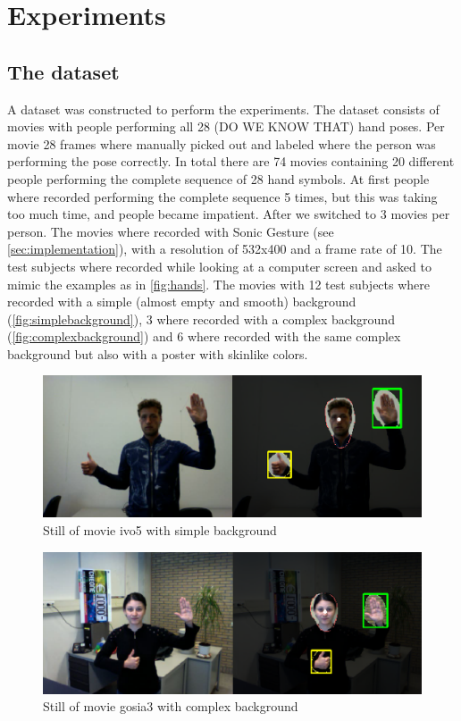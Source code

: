 
\chapter{Experiments}
\label{ch:experiments}


\section{The dataset}
A dataset was constructed to perform the experiments. The dataset consists of movies with people performing all 28 (DO WE KNOW THAT) hand poses. Per movie 28 frames where manually picked out and labeled where the person was performing the pose correctly. In total there are 74 movies containing 20 different people performing the complete sequence of 28 hand symbols. At first people where recorded performing the complete sequence 5 times, but this was taking too much time, and people became impatient. After we switched to 3 movies per person. The movies where recorded with Sonic Gesture (see \autoref{sec:implementation}), with a resolution of 532x400 and a frame rate of 10. The test subjects where recorded while looking at a computer screen and asked to mimic the examples as in \autoref{fig:hands}. The movies with 12 test subjects where recorded with a simple (almost empty and smooth) background (\autoref{fig:simplebackground}), 3 where recorded with a complex background (\autoref{fig:complexbackground}) and 6 where recorded with the same complex background but also with a poster with skinlike colors.

\begin{figure}[htbp]
\center{}
\includegraphics[width=0.8\linewidth]{figures/simple.png}
\caption{Still of movie ivo5 with simple background}
\label{fig:simplebackground}
\end{figure}

\begin{figure}[htbp]
\center{}
\includegraphics[width=0.8\linewidth]{figures/complex.png}
\caption{Still of movie gosia3 with complex background}
\label{fig:complexbackground}
\end{figure}

